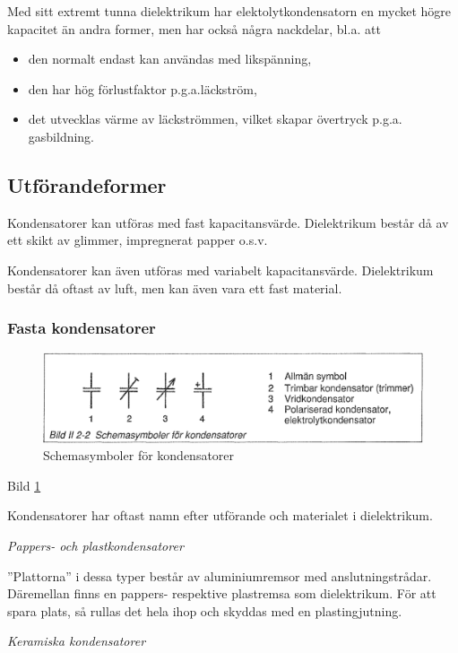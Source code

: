 Med sitt extremt tunna dielektrikum har elektolytkondensatorn en mycket högre
kapacitet än andra former, men har också några nackdelar, bl.a. att
\begin{itemize}
  \item den normalt endast kan användas med likspänning,
  \item den har hög förlustfaktor p.g.a.läckström,
  \item det utvecklas värme av läckströmmen, vilket skapar övertryck p.g.a.
    gasbildning.
\end{itemize}


\subsection{Utförandeformer}

Kondensatorer kan utföras med fast kapacitansvärde. Dielektrikum består då av
ett skikt av glimmer, impregnerat papper o.s.v.

Kondensatorer kan även utföras med variabelt kapacitansvärde. Dielektrikum
består då oftast av luft, men kan även vara ett fast material.

\subsubsection{Fasta kondensatorer}

\begin{figure}
\includegraphics[width=\textwidth]{images/bild_2_2-02}
\caption{Schemasymboler för kondensatorer}
\label{fig:BildII2-2}
\end{figure}

Bild \ref{fig:BildII2-2}

Kondensatorer har oftast namn efter utförande och materialet i dielektrikum.

\emph{Pappers- och plastkondensatorer}

''Plattorna'' i dessa typer består av aluminiumremsor med anslutningstrådar.
Däremellan finns en pappers- respektive plastremsa som dielektrikum. För att
spara plats, så rullas det hela ihop och skyddas med en plastingjutning.

\emph{Keramiska kondensatorer}


